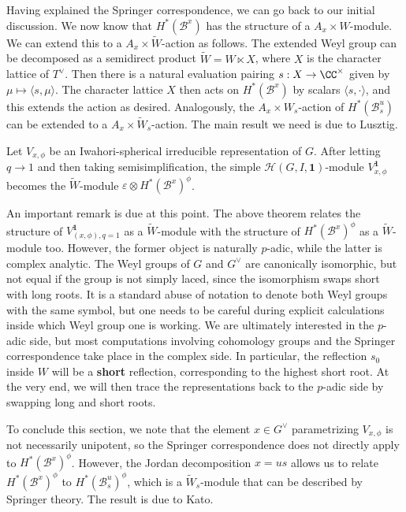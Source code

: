 Having explained the Springer correspondence, we can go back to our initial discussion. We now know that $H^*(\mathcal{B}^x)$ has the structure of a $A_x\times W$-module. We can extend this to a $A_x\times\widetilde{W}$-action as follows. The extended Weyl group can be decomposed as a semidirect product $\widetilde{W}=W\ltimes X$, where $X$ is the character lattice of $T^\vee$. Then there is a natural evaluation pairing $s:X\rightarrow \CC^\times$ given by $\mu\mapsto\langle s,\mu\rangle$. The character lattice $X$ then acts on $H^*(\mathcal{B}^x)$ by scalars $\langle s,\cdot\rangle$, and this extends the action as desired. Analogously, the $A_x\times W_s$-action of $H^*(\mathcal{B}^u_s)$ can be extended to a $A_x\times\widetilde{W}_s$-action. The main result we need is due to Lusztig.

\begin{theorem}\label{thm:Kato_module}
    Let $V_{x,\phi}$ be an Iwahori-spherical irreducible representation of $G$. After letting $q\rightarrow 1$ and then taking semisimplification, the simple $\mathcal{H}(G,I,\mathbf{1})$-module $V^\mathbf{1}_{x,\phi}$ becomes the $\widetilde{W}$-module $\varepsilon\otimes H^*(\mathcal{B}^x)^\phi$. 
\end{theorem}

\begin{remark}\label{rem:Weylgroups}
    An important remark is due at this point. The above theorem relates the structure of $V^\mathbf{1}_{(x,\phi),q=1}$ as a $\widetilde{W}$-module with the structure of $H^*(\mathcal{B}^x)^\phi$ as a $\widetilde{W}$-module too. However, the former object is naturally $p$-adic, while the latter is complex analytic. The Weyl groups of $G$ and $G^\vee$ are canonically isomorphic, but not equal if the group is not simply laced, since the isomorphism swaps short with long roots. It is a standard abuse of notation to denote both Weyl groups with the same symbol, but one needs to be careful during explicit calculations inside which Weyl group one is working. We are ultimately interested in the $p$-adic side, but most computations involving cohomology groups and the Springer correspondence take place in the complex side. In particular, the reflection $s_0$ inside $W$ will be a \textbf{short} reflection, corresponding to the highest short root. At the very end, we will then trace the representations back to the $p$-adic side by swapping long and short roots. 
\end{remark}

To conclude this section, we note that the element $x\in G^\vee$ parametrizing $V_{x,\phi}$ is not necessarily unipotent, so the Springer correspondence does not directly apply to $H^*(\mathcal{B}^x)^\phi$. However, the Jordan decomposition $x=us$ allows us to relate $H^*(\mathcal{B}^x)^\phi$ to $H^*(\mathcal{B}_s^u)^\phi$, which is a $\widetilde{W}_s$-module that can be described by Springer theory. The result is due to Kato.

